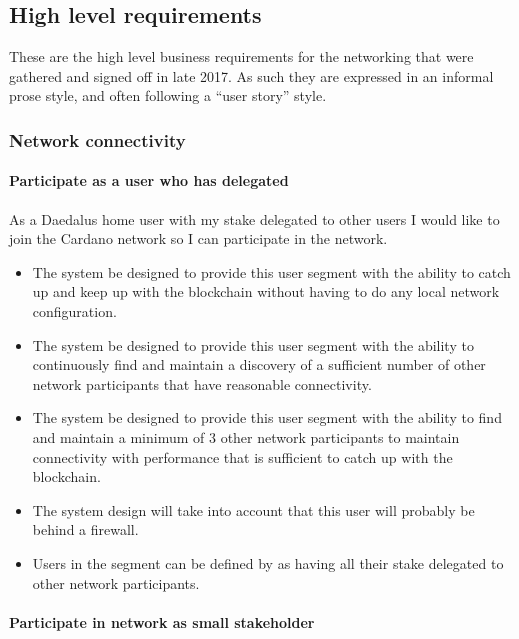 \documentclass{report}
\theoremstyle{definition}{
  \newtheorem{lemma}{Lemma}[section] %
  \newtheorem{definition}[lemma]{Definition}
}
\theoremstyle{theorem}{
  \newtheorem{invariant}[lemma]{Invariant}
  \newtheorem{proofobligation}[lemma]{Proof Obligation}
}
\numberwithin{equation}{lemma}
\begin{document}
\subsection{High level requirements}

These are the high level business requirements for the networking that were
gathered and signed off in late 2017. As such they are expressed in an informal
prose style, and often following a ``user story'' style.

\subsubsection{Network connectivity}

\paragraph{Participate as a user who has delegated}

As a Daedalus home user with my stake delegated to other users I would like to
join the Cardano network so I can participate in the network.
\begin{itemize}
\item The system be designed to provide this user segment with the ability
      to catch up and keep up with the blockchain without having to do any local
      network configuration.
\item The system be designed to provide this user segment with the ability to
      continuously find and maintain a discovery of a sufficient number of
      other network participants that have reasonable connectivity.
\item The system be designed to provide this user segment with the ability to
      find and maintain a minimum of 3 other network participants to maintain
      connectivity with performance that is sufficient to catch up with the
      blockchain.
\item The system design will take into account that this user will probably be
      behind a firewall.
\item Users in the segment can be defined by as having all their stake
      delegated to other network participants.
\end{itemize}


\paragraph{Participate in network as small stakeholder}
\end{document}
